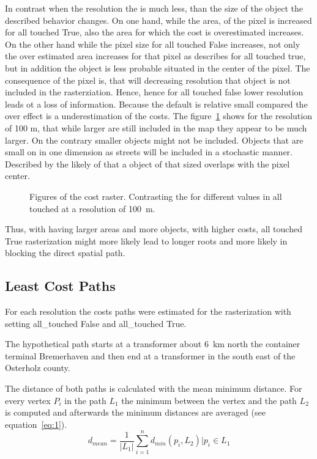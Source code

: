 In contrast when the resolution the is much less, than the size of the object the described behavior changes.
On one hand, while the area, of the pixel is increased for all touched True, also the area for which the cost is overestimated increases.
On the other hand while the pixel size for all touched  False increases, not only the over estimated area increases for that pixel as describes for all touched true, but in addition the object is less probable situated in the center of the pixel.
The consequence of the pixel is, that will decreasing resolution that object is not included in the rasterziation.
Hence, hence for all touched false lower resolution  leads ot a loss of information.
Because the default is relative small compared the over effect is a underestimation of the costs.
The figure~\ref{fig:costs_100m} shows for the resolution of 100 m, that while larger are still included in the map they appear to be much larger.
On the contrary smaller objects might not be included.
Objects that are small on in one dimension as streets will be included in a stochastic manner.
Described by the likely of that a object of that sized overlaps with the pixel center.
\begin{figure}
	\centering

	\qquad
	\caption{Figures of the cost raster. Contrasting the for different values in all touched at a resolution of 100~m.}
	\label{fig:costs_100m}
\end{figure}
Thus, with having larger areas and more objects, with higher costs, all touched True rasterization might more likely lead to longer roots and more likely in blocking the  direct spatial path.

\subsection{Least Cost Paths}\label{subsec:least-cost-paths}
For each resolution the costs paths were estimated for the rasterization with setting all\_touched False
and all\_touched True.

The hypothetical path starts at a transformer about 6~km north the container terminal Bremerhaven and then end at a transformer in the south east of the Osterholz county. 

The distance of both paths is calculated with the mean minimum distance.
For every vertex $P_i$ in the path $L_1$ the minimum between the vertex and the path $L_2$
is computed and afterwards the minimum distances are averaged (see equation~\ref{eq:1}).
\begin{equation}
	\label{eq:1}
	d_{mean} = \frac{1}{|L_1|} \sum_{i=1}^{n} d_{min}(p_i, L_2) \bigg\vert p_i \in L_1
\end{equation}

